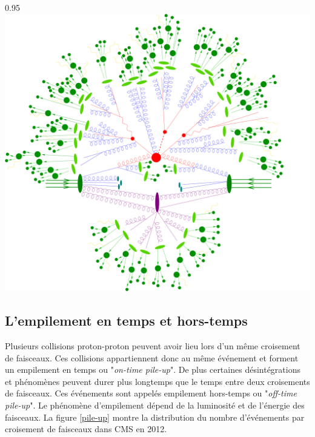 \begin{minipagewithmarginpars}[ht!]{0.95\textwidth}
	\centering
	\includegraphics[width=1.0\textwidth]{LHC/event.jpg}
	\label{collision2}	
\end{minipagewithmarginpars}

\subsection{L'empilement en temps et hors-temps}
Plusieurs collisions proton-proton peuvent avoir lieu lors d'un même croisement de faisceaux. Ces collisions appartiennent donc au même événement et forment un empilement en temps ou "\textit{on-time pile-up}". De plus certaines désintégrations et phénomènes peuvent durer plus longtemps que le temps entre deux croisements de faisceaux. Ces événements sont appelés empilement hors-temps ou "\textit{off-time pile-up}". Le phénomène d'empilement dépend de la luminosité et de l'énergie des faisceaux. La figure \ref{pile-up} montre la distribution du nombre d'événements par croisement de faisceaux dans CMS en \num{2012}.

